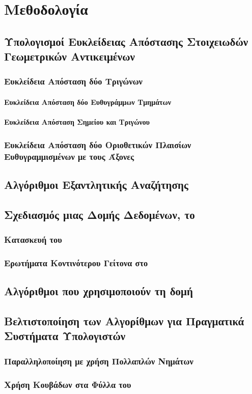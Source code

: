 \chapter{Μεθοδολογία}

\section{Υπολογισμοί Ευκλείδειας Απόστασης Στοιχειωδών Γεωμετρικών Αντικειμένων}
\subsection{Ευκλείδεια Απόσταση δύο Τριγώνων}
\subsubsection{Ευκλείδεια Απόσταση δύο Ευθυγράμμων Τμημάτων}
\subsubsection{Ευκλείδεια Απόσταση Σημείου και Τριγώνου}
\subsection{Ευκλείδεια Απόσταση δύο Οριοθετικών Πλαισίων Ευθυγραμμισμένων με τους Άξονες}

\section{Αλγόριθμοι Εξαντλητικής Αναζήτησης}

\section{Σχεδιασμός μιας  Δομής Δεδομένων, το }
\subsection{Κατασκευή του }
\subsection{Ερωτήματα Κοντινότερου Γείτονα στο }


\section{Αλγόριθμοι που χρησιμοποιούν τη δομή }

\section{Βελτιστοποίηση των Αλγορίθμων για Πραγματικά Συστήματα Υπολογιστών}
\subsection{Παραλληλοποίηση με χρήση Πολλαπλών Νημάτων }
\subsection{Χρήση Κουβάδων στα Φύλλα του }